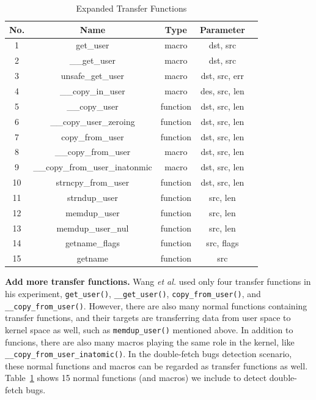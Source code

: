 \documentclass[10pt]{llncs}
\begin{document}
\begin{table}[t!]
\caption{Expanded Transfer Functions}
\centering
\begin{tabular}{ccccc} 
  \hline
  \textbf{No.} & \textbf{Name} & \textbf{Type} & \textbf{Parameter} \\
  \hline
  1 & get\_user & macro & dst, src \\
  2 & \_\_get\_user & macro & dst, src \\
  3 & unsafe\_get\_user & macro & dst, src, err \\
  4 & \_\_copy\_in\_user & macro & des, src, len \\
  5 & \_\_copy\_user & function & dst, src, len \\
  6 & \_\_copy\_user\_zeroing & function & dst, src, len \\
  7 & copy\_from\_user & function & dst, src, len \\
  8 & \_\_copy\_from\_user & macro & dst, src, len \\
  9 & \_\_copy\_from\_user\_inatonmic & macro & dst, src, len \\
  10 & strncpy\_from\_user & function & dst, src, len \\
  11 & strndup\_user & function & src, len \\
  12 & memdup\_user & function & src, len \\
  13 & memdup\_user\_nul & function & src, len \\
  14 & getname\_flags & function & src, flags \\
  15 & getname & function & src \\
  \hline
\end{tabular}
\label{transfer-func}
\end{table}

\textbf{Add more transfer functions.} Wang \textit{et al.} used only four transfer functions in his experiment, \verb:get_user():, \verb:__get_user():, \verb:copy_from_user():, and \verb:__copy_from_user():. However, there are also many normal functions containing transfer functions, and their targets are transferring data from user space to kernel space as well, such as \verb:memdup_user(): mentioned above. In addition to funcions, there are also many macros playing the same role in the kernel, like \verb:__copy_from_user_inatomic():.
In the double-fetch bugs detection scenario, these normal functions and macros can be regarded as transfer functions as well. Table~\ref{transfer-func} shows 15 normal functions (and macros) we include to detect double-fetch bugs.%
\end{document}
